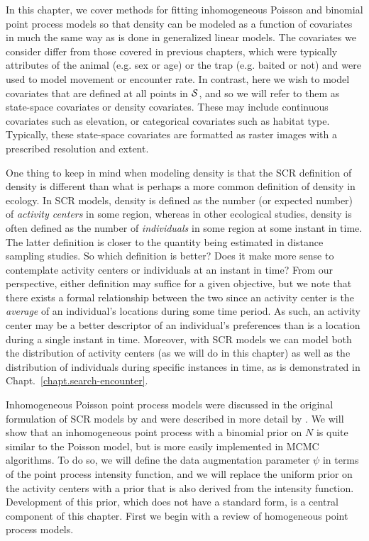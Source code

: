 In this chapter, we cover methods %
for fitting inhomogeneous Poisson and binomial
point process models so that density can be modeled as a
function of covariates in much the same way as is done in generalized linear
models. The covariates we consider differ
from those covered in previous chapters, which were typically
attributes of the animal (e.g. sex or age) or the trap (e.g. baited or
not) and were used to model movement or encounter
rate. In contrast, here we wish to model covariates that are defined
at all points in $\cal S$, and so we will refer to them as
state-space covariates or density covariates. These may
include continuous covariates such as elevation, or categorical
covariates such as habitat type. Typically, these
state-space covariates are formatted
as raster images with a prescribed resolution and extent.

One thing to keep in mind when modeling density
is that the SCR definition of density is %
different than what is perhaps a more common definition of density in
ecology. In SCR models, density is defined as the number (or expected
number) of \textit{activity centers} in some region, whereas in other
ecological studies, density is often defined as the number of
\textit{individuals} in some region at some instant in
time. The latter definition is closer to the quantity being estimated
in distance sampling studies. So which definition is better? Does it
make more sense to contemplate activity centers or individuals at an
instant in time? From our perspective, either definition may suffice
for a given objective, but we note that there exists a formal
relationship between the two since an activity center is the
\textit{average} of an individual's locations during some time period. As
such, an activity center may be a better descriptor of an individual's
preferences than is a location during a single instant in
time. Moreover, with SCR models we can model both the distribution of
activity centers (as we will do in this chapter) as
well as the distribution of individuals during specific instances in
time, as is demonstrated in Chapt.~\ref{chapt.search-encounter}.

Inhomogeneous Poisson point process models were discussed in the original
formulation of SCR models by \citet{efford:2004} and were described in
more detail by \citet{borchers_efford:2008}. We will show that an
inhomogeneous point process with a binomial prior on $N$ is quite similar to the Poisson
model, but is more easily implemented in MCMC algorithms. To do so, we
will define the data augmentation parameter $\psi$ in terms of the point
process intensity function, and we will replace the uniform prior on the
activity centers with a prior that is also derived from the intensity
function. Development of this prior, which does not have a
standard form, is a central component of this chapter. First we
begin with a review of homogeneous point process models.


